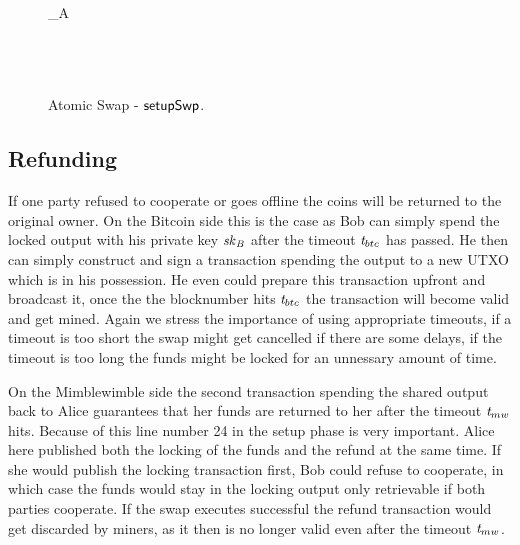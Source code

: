 \begin{landscape}
\begin{figure}
{{        \varUTXO_{A} \opFunResult \procCreateUTXO{\varAmountBtc}{\funStarAlt{\varPubKeyAlice}} \< \< \< \< \\
        \varBtcTx \opFunResult {} \< \< \< \< \\
        \funStar{\varBtcTx} \opFunResult {} \< \< \< \< \\
        \procPublishBtc{\funStar{\varBtcTx}} \< \< \< \< \\
         \< \< \< \< 
        }
        }
        \caption{Atomic Swap - $\mathsf{setupSwp}$. \label{fig:exec-swap}}
    \end{figure}
\end{landscape}
\restoregeometry

\subsection{Refunding}\label{subsec:atom:refund}

If one party refused to cooperate or goes offline the coins will be returned to the original owner.
On the Bitcoin side this is the case as Bob can simply spend the locked output with his private key $\mathit{sk}_{\mathit{B}}$ after the timeout $\mathit{t}_{btc}$ has passed.
He then can simply construct and sign a transaction spending the output to a new UTXO which is in his possession.
He even could prepare this transaction upfront and broadcast it, once the the blocknumber hits $\mathit{t}_{btc}$ the transaction will become valid and get mined.
Again we stress the importance of using appropriate timeouts, if a timeout is too short the swap might get cancelled if there are some delays, if the timeout is too long the funds might be locked for an unnessary amount of time.

On the Mimblewimble side the second transaction spending the shared output back to Alice guarantees that her funds are returned to her after the timeout $\mathit{t}_{mw}$ hits.
Because of this line number 24 in the setup phase is very important.
Alice here published both the locking of the funds and the refund at the same time.
If she would publish the locking transaction first, Bob could refuse to cooperate, in which case the funds would stay in the locking output only retrievable if both parties cooperate.
If the swap executes successful the refund transaction would get discarded by miners, as it then is no longer valid even after the timeout $\mathit{t}_{mw}$.